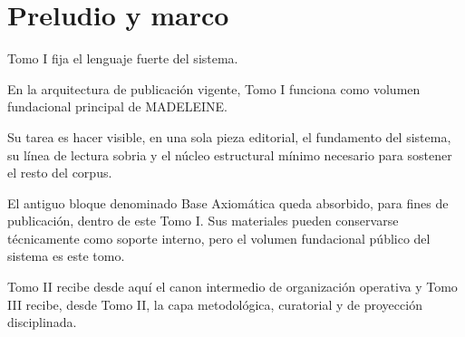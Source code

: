 \chapter{Preludio y marco}

Tomo I fija el lenguaje fuerte del sistema.

\begin{observation}
En la arquitectura de publicación vigente, Tomo I funciona como volumen fundacional principal de MADELEINE.
\end{observation}

\begin{observation}
Su tarea es hacer visible, en una sola pieza editorial, el fundamento del sistema, su línea de lectura sobria y el núcleo estructural mínimo necesario para sostener el resto del corpus.
\end{observation}

\begin{observation}
El antiguo bloque denominado Base Axiomática queda absorbido, para fines de publicación, dentro de este Tomo I. Sus materiales pueden conservarse técnicamente como soporte interno, pero el volumen fundacional público del sistema es este tomo.
\end{observation}

\begin{observation}
Tomo II recibe desde aquí el canon intermedio de organización operativa y Tomo III recibe, desde Tomo II, la capa metodológica, curatorial y de proyección disciplinada.
\end{observation}

